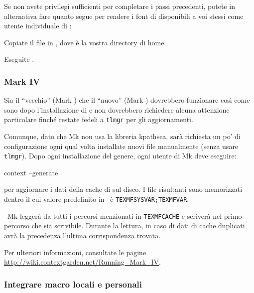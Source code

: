 \documentclass{article}
\begin{document}
Se non avete privilegi sufficienti per completare i passi precedenti,
potete in alternativa fare quanto segue per rendere i font di \TL{}
disponibili a voi stessi come utente individuale di \XeTeX{}:
\begin{enumerate*}
\item Copiate il file  in
  , dove \filename{~} è la vostra directory di
  home.

\item Eseguite .
\end{enumerate*}


\subsubsection{\ConTeXt{} Mark IV}
\label{sec:context-mkiv}

Sia il ``vecchio'' \ConTeXt{} (Mark ) che il ``nuovo'' \ConTeXt{}
(Mark ) dovrebbero funzionare così come sono dopo l'installazione
di \TL{} e non dovrebbero richiedere alcuna attenzione particolare finché
restate fedeli a \verb+tlmgr+ per gli aggiornamenti.

Comunque, dato che \ConTeXt{} Mk non usa la libreria kpathsea,
sarà richiesta un po' di configurazione ogni qual volta installate nuovi
file manualmente (senza usare \verb+tlmgr+). Dopo ogni installazione del
genere, ogni utente di Mk deve eseguire:
\begin{sverbatim}
context --generate
\end{sverbatim}
per aggiornare  i dati della cache di \ConTeXt{} sul disco.
I file risultanti sono memorizzati dentro  il cui valore
predefinito in \TL\ è \verb+TEXMFSYSVAR;TEXMFVAR+.

\ConTeXt\ Mk leggerà da tutti i percorsi menzionati in
\verb+TEXMFCACHE+ e scriverà nel primo percorso che sia scrivibile. Durante
la lettura, in caso di dati di cache duplicati avrà la precedenza l'ultima
corrispondenza trovata.

Per ulteriori informazioni, consultate le pagine
\url{http://wiki.contextgarden.net/Running_Mark_IV}.


\subsubsection{Integrare macro locali e personali}
\label{sec:local-personal-macros}
\end{document}
